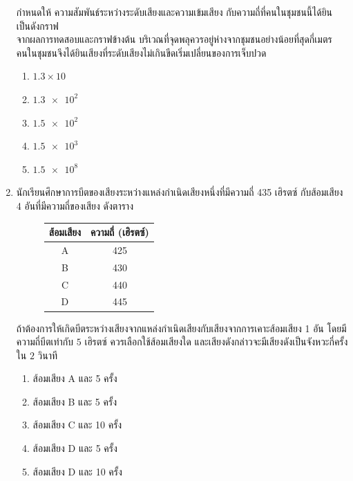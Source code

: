 \documentclass[a4paper, 12pt]{article}
\begin{document}
\begin{enumerate}
          กำหนดให้ ความสัมพันธ์ระหว่างระดับเสียงและความเข้มเสียง กับความถี่ที่คนในชุมชนนี้ได้ยิน เป็นดังกราฟ \\
          จากผลการทดสอบและกราฟข้างต้น บริเวณที่จุดพลุควรอยู่ห่างจากชุมชนอย่างน้อยที่สุดกี่เมตร คนในชุมชนจึงได้ยินเสียงที่ระดับเสียงไม่เกินขีดเริ่มเปลี่ยนของการเจ็บปวด
          \begin{enumerate}
              \item \(1.3\times10\)
              \item \(\num{1.3e2}\)
              \item \(\num{1.5e2}\)
              \item \(\num{1.5e3}\)
              \item \(\num{1.5e8}\)
          \end{enumerate}
          \newpage
    \item นักเรียนศึกษาการบีตของเสียงระหว่างแหล่งกำเนิดเสียงหนึ่งที่มีความถี่ 435 เฮิรตซ์ กับส้อมเสียง 4 อันที่มีความถี่ของเสียง ดังตาราง
          \begin{figure}[H]
              \centering
              \begin{tabular}{|c|c|}
                  \hline
                  ส้อมเสียง & ความถี่ (เฮิรตซ์) \\
                  \hline
                  A       & 425           \\
                  \hline
                  B       & 430           \\
                  \hline
                  C       & 440           \\
                  \hline
                  D       & 445           \\
                  \hline
              \end{tabular}
          \end{figure}
          ถ้าต้องการให้เกิดบีตระหว่างเสียงจากแหล่งกำเนิดเสียงกับเสียงจากการเคาะส้อมเสียง 1 อัน โดยมีความถี่บีตเท่ากับ \(5\) เฮิรตซ์ ควรเลือกใช้ส้อมเสียงใด และเสียงดังกล่าวจะมีเสียงดังเป็นจังหวะกี่ครั้งใน \(2\) วินาที
          \begin{enumerate}
              \item ส้อมเสียง A และ 5 ครั้ง
              \item ส้อมเสียง B และ 5 ครั้ง
              \item ส้อมเสียง C และ 10 ครั้ง
              \item ส้อมเสียง D และ 5 ครั้ง
              \item ส้อมเสียง D และ 10 ครั้ง

\end{enumerate}
\end{enumerate}
\end{document}
